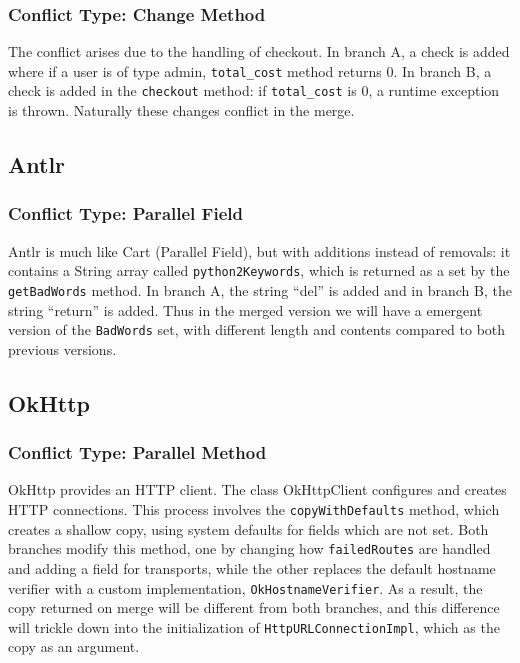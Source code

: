 \subsubsection{Conflict Type: Change Method}

The conflict arises due to the handling of checkout. In branch A, a check is added where if a user is of type admin,
\texttt{total\_cost} method returns 0. In branch B, a check is added in the \texttt{checkout} method: if \texttt{total\_cost} is 0, a runtime exception is thrown.
Naturally these changes conflict in the merge.

\subsection{Antlr}

\subsubsection{Conflict Type: Parallel Field}

Antlr is much like Cart (Parallel Field), but with additions instead of removals: it contains a String array called \texttt{python2Keywords}, which is returned as a set by the \texttt{getBadWords} method.
In branch A, the string ``del'' is added and in branch B, the string ``return'' is added.
Thus in the merged version we will have a emergent version of the \texttt{BadWords}
set, with different length and contents compared to both previous versions.

\subsection{OkHttp}

\subsubsection{Conflict Type: Parallel Method}

OkHttp provides an HTTP client. The class OkHttpClient configures and creates HTTP connections. This process involves
the \texttt{copyWithDefaults} method, which creates a shallow copy, using system defaults for fields which are not set. Both branches
modify this method, one by changing how \texttt{failedRoutes} are handled and adding a field for transports, while the other replaces
the default hostname verifier with a custom implementation, \texttt{OkHostnameVerifier}. As a result, the copy returned on merge will
be different from both branches, and this difference will trickle down into the initialization of \texttt{HttpURLConnectionImpl}, which
as the copy as an argument.

